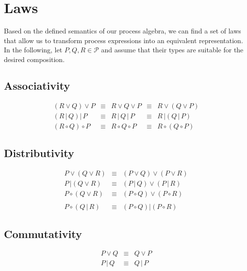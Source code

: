 \section{Laws}
\label{chp:laws}
Based on the defined semantics of our process algebra, we can find a set of laws that allow us to transform process expressions into an equivalent representation. In the following, let $P, Q, R \in \mathcal{P}$ and assume that their types are suitable for the desired composition.

\subsection{Associativity}
\begin{equation*}
\begin{array}{rcccl}
  \left( R \vee Q \right) \vee P & \equiv & R \vee Q \vee P & \equiv & R \vee \left( Q \vee P \right) \\
  \left( R \,|\, Q \right) |\, P & \equiv & R \,|\, Q \,|\, P & \equiv & R \,| \left( Q \,|\, P \right) \\
  \left( R \circ Q \right) \circ P & \equiv & R \circ Q \circ P & \equiv & R \circ \left( Q \circ P \right)
\end{array}
\end{equation*}

\subsection{Distributivity}
\begin{eqnarray*}
  P \vee \left( Q \vee R \right) & \equiv & \left( P \vee Q \right) \vee \left( P \vee R \right) \\
  P \,| \left( Q \vee R \right) & \equiv & \left( P \,|\, Q \right) \vee \left( P \,|\, R \right) \\
  P \circ \left( Q \vee R \right) & \equiv & \left( P \circ Q \right) \vee \left( P \circ R \right) \\
  & & \\
  P \circ \left( Q \,|\, R \right) & \equiv & \left( P \circ Q \right) | \left( P \circ R \right)
\end{eqnarray*}

\subsection{Commutativity}
\begin{eqnarray*}
  P \vee Q & \equiv & Q \vee P \\
  P \,|\, Q & \equiv & Q \,|\, P
\end{eqnarray*}

